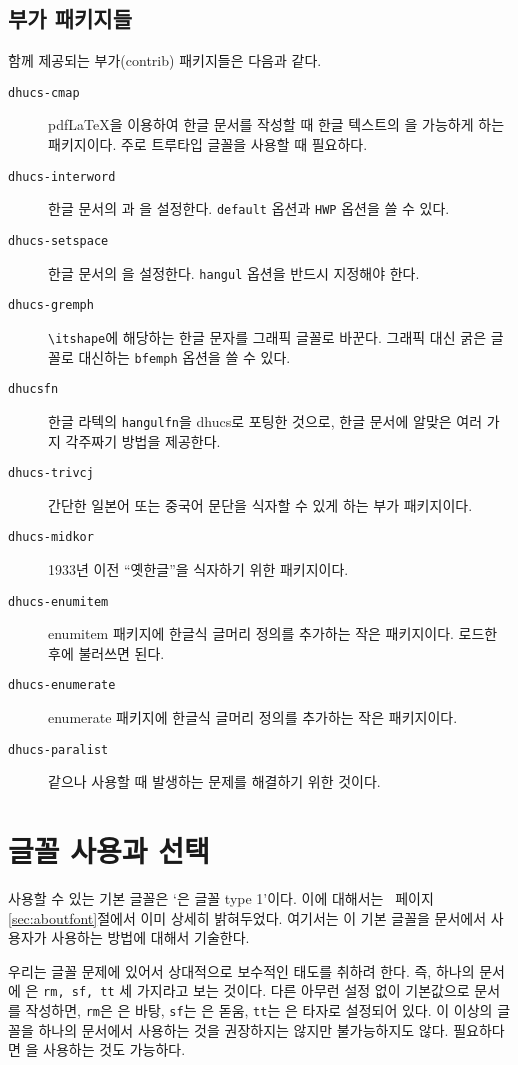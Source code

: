 \subsection{부가 패키지들}
\thispkg\와 함께 제공되는 부가(contrib) 패키지들은 다음과 같다.
\begin{description}
\item[\texttt{dhucs-cmap}]
pdf\LaTeX 을 이용하여 한글 문서를 작성할 때 한글 텍스트의 을
가능하게 하는 패키지이다. 주로 트루타입 글꼴을 사용할 때 필요하다.
\item[\texttt{dhucs-interword}]
한글 문서의 과 을 설정한다. \texttt{default} 옵션과
\texttt{HWP} 옵션을 쓸 수 있다.
\item[\texttt{dhucs-setspace}]
한글 문서의 을 설정한다. \texttt{hangul} 옵션을 반드시
지정해야 한다.
\item[\texttt{dhucs-gremph}]
\verb|\itshape|에 해당하는 한글 문자를 그래픽 글꼴로 바꾼다.
그래픽 대신 굵은 글꼴로 대신하는 \texttt{bfemph} 옵션을 쓸
수 있다.
\item[\texttt{dhucsfn}]
한글 라텍의 \texttt{hangulfn}을 dhucs로 포팅한 것으로,
한글 문서에 알맞은 여러 가지 각주짜기 방법을 제공한다.
\item[\texttt{dhucs-trivcj}]
간단한 일본어 또는 중국어 문단을 식자할 수 있게 하는 부가 패키지이다.
\item[\texttt{dhucs-midkor}]
1933년 이전 ``옛한글''을 식자하기 위한 패키지이다. 
\item[\texttt{dhucs-enumitem}]
enumitem 패키지에 한글식 글머리 정의를 추가하는 작은 패키지이다.
\를 로드한 후에 불러쓰면 된다.
\item[\texttt{dhucs-enumerate}]
enumerate 패키지에 한글식 글머리 정의를 추가하는 작은 패키지이다. 
\item[\texttt{dhucs-paralist}]
\와 같으나 \를 사용할 때
발생하는 문제를 해결하기 위한 것이다. 
\end{description}

\section{글꼴 사용과 선택}

 사용할 수 있는 기본 글꼴은 `은 글꼴 type 1'이다.
이에 대해서는 \pageref{sec:aboutfont}~페이지 \ref{sec:aboutfont}절에서
이미 상세히 밝혀두었다. 여기서는 이 기본 글꼴을 문서에서 사용자가
사용하는 방법에 대해서 기술한다. 

우리는 글꼴 문제에 있어서 상대적으로 보수적인 태도를
취하려 한다. 즉, 하나의 문서에 은
\texttt{rm, sf, tt} 세 가지라고 보는 것이다.
다른 아무런 설정 없이 기본값으로 문서를 작성하면, \texttt{rm}은
은 바탕, \texttt{sf}는 은 돋움, \texttt{tt}는 은 타자로 설정되어
있다.
이 이상의 글꼴을 하나의 문서에서 사용하는 것을 권장하지는 않지만
불가능하지도 않다. 필요하다면 을
사용하는 것도 가능하다.

